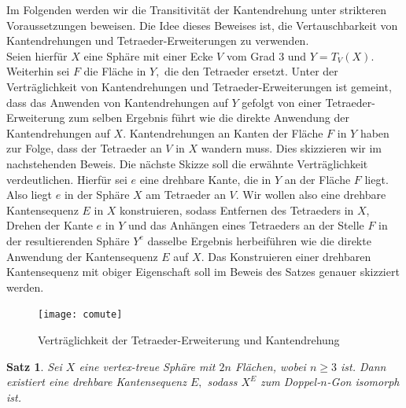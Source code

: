 \documentclass[12pt,titlepage,twoside,cleardoublepage]{article}
\theoremstyle{nummermitklammern}
\newtheorem{satz}[temp]{Satz}
\newtheorem{satz}[zahl]{Satz}
\numberwithin{equation}{section}
\begin{document}
  
Im Folgenden werden wir die Transitivität der Kantendrehung unter strikteren Voraussetzungen beweisen. Die Idee dieses Beweises ist, die Vertauschbarkeit von Kantendrehungen und Tetraeder-Erweiterungen zu verwenden. \\
Seien hierfür $X$ eine Sphäre mit einer Ecke $V$ vom Grad 3 und $Y=T_V(X)$. Weiterhin sei $F$ die Fläche in $Y,$ die den Tetraeder ersetzt. Unter der Verträglichkeit von Kantendrehungen und Tetraeder-Erweiterungen ist gemeint, dass das Anwenden von Kantendrehungen auf $Y$ gefolgt von einer Tetraeder-Erweiterung zum selben Ergebnis führt wie die direkte Anwendung der Kantendrehungen auf $X$. Kantendrehungen an Kanten der Fläche $F$ in $Y$ haben zur Folge, dass der Tetraeder an $V$ in $X$ wandern muss. Dies skizzieren wir im nachstehenden Beweis. Die nächste Skizze soll die erwähnte Verträglichkeit verdeutlichen. Hierfür sei $e$ eine drehbare Kante, die in $Y$ an der Fläche $F$ liegt. Also liegt $e$ in der Sphäre $X$ am Tetraeder an $V$. Wir wollen also eine drehbare Kantensequenz $E$ in $X$ konstruieren, sodass Entfernen des Tetraeders in $X$, Drehen der Kante $e$ in $Y$ und das Anhängen eines Tetraeders an der Stelle $F$ in der resultierenden Sphäre $Y^e$ dasselbe Ergebnis herbeiführen wie die direkte Anwendung der Kantensequenz $E$ auf $X$. Das Konstruieren einer drehbaren Kantensequenz mit obiger Eigenschaft soll im Beweis des Satzes genauer skizziert werden.
\begin{center}
\begin{figure}[H]
\texttt{[image: comute]}
\caption{Verträglichkeit der Tetraeder-Erweiterung und Kantendrehung}
\end{figure}
\end{center}
\begin{satz}\label{3eck}
Sei $X$ eine vertex-treue Sphäre mit $2n$ Flächen, wobei $n\geq 3$ ist. Dann existiert eine drehbare Kantensequenz $E,$ sodass $X^E$ zum Doppel-$n$-Gon isomorph ist. 
\end{satz}
\end{document}
